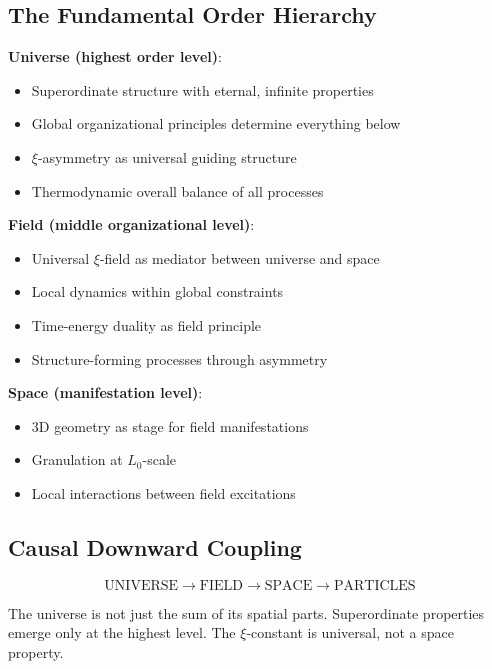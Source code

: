 \documentclass[12pt,a4paper]{article}
\newcommand{\xipar}{\xi}
\newcommand{\Lzero}{L_0}
\theoremstyle{definition}
\theoremstyle{remark}
\begin{document}
	\subsection{The Fundamental Order Hierarchy}
	
	\textbf{Universe (highest order level)}:
	\begin{itemize}
		\item Superordinate structure with eternal, infinite properties
		\item Global organizational principles determine everything below
		\item $\xipar$-asymmetry as universal guiding structure
		\item Thermodynamic overall balance of all processes
	\end{itemize}
	
	\textbf{Field (middle organizational level)}:
	\begin{itemize}
		\item Universal $\xipar$-field as mediator between universe and space
		\item Local dynamics within global constraints
		\item Time-energy duality as field principle
		\item Structure-forming processes through asymmetry
	\end{itemize}
	
	\textbf{Space (manifestation level)}:
	\begin{itemize}
		\item 3D geometry as stage for field manifestations
		\item Granulation at $\Lzero$-scale
		\item Local interactions between field excitations
	\end{itemize}
	
	\subsection{Causal Downward Coupling}
	
	\begin{equation}
		\text{UNIVERSE} \rightarrow \text{FIELD} \rightarrow \text{SPACE} \rightarrow \text{PARTICLES}
	\end{equation}
	
	The universe is not just the sum of its spatial parts. Superordinate properties emerge only at the highest level. The $\xipar$-constant is universal, not a space property.
	
\end{document}

